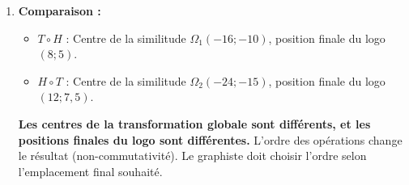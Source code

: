 \documentclass[11pt]{article}
\begin{document}
\begin{exoresolu}
\begin{enumerate}
\begin{itemize}
        \item \textit{Note :} Le logo final est centré sur $H(T(O)) = H(8;5) = (12;7,5)$.
    \end{itemize}
    \item \textbf{Comparaison :}
    \begin{itemize}
        \item $T \circ H$ : Centre de la similitude $\Omega_1(-16;-10)$, position finale du logo $(8;5)$.
        \item $H \circ T$ : Centre de la similitude $\Omega_2(-24;-15)$, position finale du logo $(12;7,5)$.
    \end{itemize}
    \textbf{Les centres de la transformation globale sont différents, et les positions finales du logo sont différentes.} L'ordre des opérations change le résultat (non-commutativité). Le graphiste doit choisir l'ordre selon l'emplacement final souhaité.
\end{enumerate}
\end{exoresolu}
\end{document}
